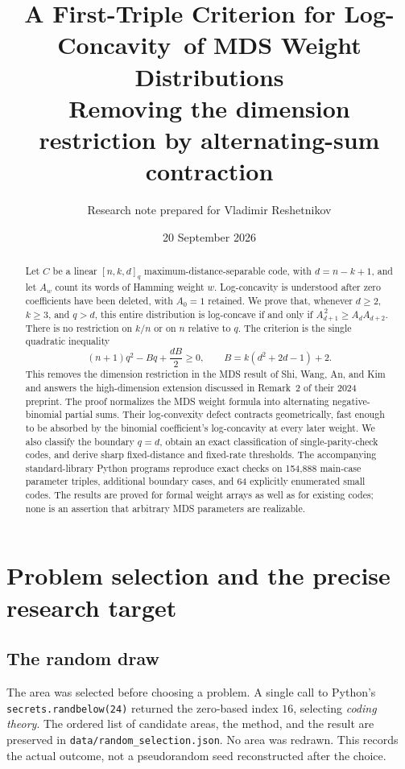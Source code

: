 \documentclass[11pt,letterpaper]{article}
\title{\textbf{A First-Triple Criterion for Log-Concavity\ of MDS Weight Distributions}\\[0.5em]
\large Removing the dimension restriction by alternating-sum contraction}
\author{Research note prepared for Vladimir Reshetnikov}
\date{20 September 2026}
\numberwithin{equation}{section}
\theoremstyle{definition}
\begin{document}
\maketitle
\begin{abstract}
Let $C$ be a linear $[n,k,d]_q$ maximum-distance-separable code, with
$d=n-k+1$, and let $A_w$ count its words of Hamming weight $w$.
Log-concavity is understood after zero coefficients have been deleted,
with $A_0=1$ retained. We prove that, whenever $d\ge2$, $k\ge3$, and
$q>d$, this entire distribution is log-concave if and only if
$A_{d+1}^{\,2}\ge A_dA_{d+2}$. There is no restriction on $k/n$ or on
$n$ relative to $q$. The criterion is the single quadratic inequality
\[
 (n+1)q^2-Bq+\frac{dB}{2}\ge0,
 \qquad B=k(d^2+2d-1)+2.
\]
This removes the dimension restriction in the MDS result of Shi, Wang,
An, and Kim and answers the high-dimension extension discussed in
Remark~2 of their 2024 preprint. The proof normalizes the MDS weight
formula into alternating negative-binomial partial sums. Their
log-convexity defect contracts geometrically, fast enough to be
absorbed by the binomial coefficient's log-concavity at every later
weight. We also classify the boundary $q=d$, obtain an exact
classification of single-parity-check codes, and derive sharp
fixed-distance and fixed-rate thresholds. The accompanying standard-library
Python programs reproduce exact checks on 154,888 main-case parameter
triples, additional boundary cases, and 64 explicitly enumerated small
codes. The results are proved for formal weight arrays as well as for
existing codes; none is an assertion that arbitrary MDS parameters are
realizable.
\end{abstract}

\clearpage
\begingroup
\setlength{\parskip}{0pt}
\tableofcontents
\endgroup
\newpage

\section{Problem selection and the precise research target}

\subsection{The random draw}
The area was selected before choosing a problem. A single call to
Python's \texttt{secrets.randbelow(24)} returned the zero-based index
$16$, selecting \emph{coding theory}. The ordered list of candidate
areas, the method, and the result are preserved in
\texttt{data/random\_selection.json}. No area was redrawn.
This records the actual outcome, not a pseudorandom seed reconstructed
after the choice.
\end{document}
